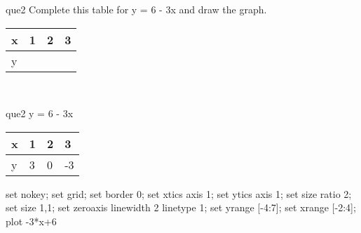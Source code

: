 \documentclass[13.5pt, varwidth=true]{beamer}
\begin{document}
\begin{frame}[shrink=19,fragile]
	\begin{beamercolorbox}[rounded=true, left, shadow=true,wd=14.8cm]{que2}
		 Complete this table for y = 6 - 3x and draw the graph. \\[0.3cm] \renewcommand{\arraystretch}{1.2}\begin{tabular}{|C|C|C|C|} \hline x & 1 & 2 & 3 \\ \hline y & & & \\ \hline \end{tabular}\\[0.3cm]
	\end{beamercolorbox}
\end{frame}
\begin{frame}[shrink=19,fragile]
	\begin{beamercolorbox}[rounded=true, left, shadow=true,wd=14.8cm]{que2}
		y = 6 - 3x\renewcommand{\arraystretch}{1.2}\begin{tabular}{|C|C|C|C|} \hline x & 1 & 2 & 3 \\ \hline y & 3 & 0 & -3\\ \hline \end{tabular}\begin{gnuplot}[terminal=pdf] set nokey; set grid; set border 0; set xtics axis 1; set ytics axis 1; set size ratio 2; set size 1,1; set zeroaxis linewidth 2 linetype 1; set yrange [-4:7]; set xrange [-2:4]; plot -3*x+6 \end{gnuplot}
	\end{beamercolorbox}
\end{frame}
\end{document}
